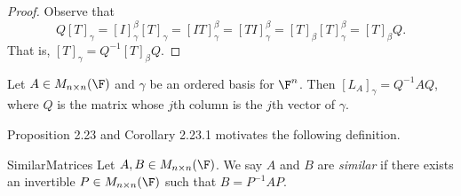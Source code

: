 \documentclass[linearalgebra]{subfiles}
\begin{document}
    \begin{proof}
        Observe that
        \begin{equation*}
            Q\left[ T \right] _\gamma = \left[ I \right] ^\beta_\gamma\left[ T \right] _\gamma = \left[ IT \right] ^\beta_\gamma = \left[ TI \right] ^\beta_\gamma = \left[ T \right] _\beta\left[ T \right] ^\beta_\gamma = \left[ T \right]_\beta Q.
        \end{equation*}
        That is, $[T]_{\gamma} = Q^{-1} [T]_\beta Q$.
    \end{proof}

    \begin{cor}{}
        Let $A\in M_{n\times n}(\F)$ and $\gamma$ be an ordered basis for $\F^n$. Then $[L_A]_\gamma = Q^{-1} AQ$, where $Q$ is the matrix whose $j$th column is the $j$th vector of $\gamma$.
    \end{cor}

    \begin{remark}
        Proposition 2.23 and Corollary 2.23.1 motivates the following definition.
    \end{remark}

    \begin{definition}{Similar}{Matrices}
        Let $A,B\in M_{n\times n}(\F)$. We say $A$ and $B$ are \emph{similar} if there exists an invertible $P\in M_{n\times n}(\F)$ such that $B=P^{-1} AP$.
    \end{definition}
\end{document}
